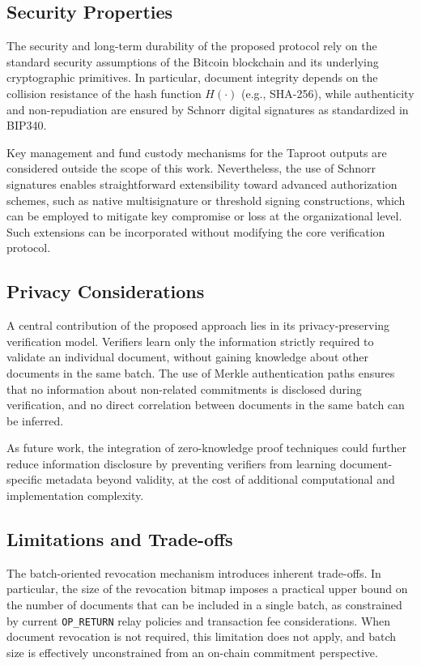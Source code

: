 \documentclass{ieeeaccess}
\begin{document}
\subsection{Security Properties}

The security and long-term durability of the proposed protocol rely on the standard security assumptions of the Bitcoin blockchain and its underlying cryptographic primitives.
In particular, document integrity depends on the collision resistance of the hash function $H(\cdot)$ (e.g., SHA-256), while authenticity and non-repudiation are ensured by Schnorr digital signatures as standardized in BIP340.

Key management and fund custody mechanisms for the Taproot outputs are considered outside the scope of this work.
Nevertheless, the use of Schnorr signatures enables straightforward extensibility toward advanced authorization schemes, such as native multisignature or threshold signing constructions, which can be employed to mitigate key compromise or loss at the organizational level.
Such extensions can be incorporated without modifying the core verification protocol.

\subsection{Privacy Considerations}

A central contribution of the proposed approach lies in its privacy-preserving verification model.
Verifiers learn only the information strictly required to validate an individual document, without gaining knowledge about other documents in the same batch.
The use of Merkle authentication paths ensures that no information about non-related commitments is disclosed during verification, and no direct correlation between documents in the same batch can be inferred.

As future work, the integration of zero-knowledge proof techniques could further reduce information disclosure by preventing verifiers from learning document-specific metadata beyond validity, at the cost of additional computational and implementation complexity.

\subsection{Limitations and Trade-offs}

The batch-oriented revocation mechanism introduces inherent trade-offs.
In particular, the size of the revocation bitmap imposes a practical upper bound on the number of documents that can be included in a single batch, as constrained by current \texttt{OP\_RETURN} relay policies and transaction fee considerations.
When document revocation is not required, this limitation does not apply, and batch size is effectively unconstrained from an on-chain commitment perspective.
\end{document}
